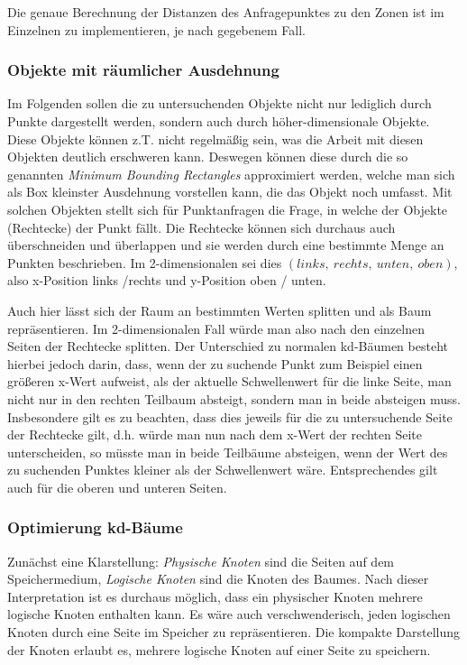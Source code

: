Die genaue Berechnung der Distanzen des Anfragepunktes zu den Zonen ist im Einzelnen
zu implementieren, je nach gegebenem Fall.

\subsubsection{Objekte mit räumlicher Ausdehnung}
Im Folgenden sollen die zu untersuchenden Objekte nicht nur lediglich durch Punkte
dargestellt werden, sondern auch durch höher-dimensionale Objekte. Diese Objekte
können z.T. nicht regelmäßig sein, was die Arbeit mit diesen Objekten deutlich
erschweren kann. Deswegen können diese durch die so genannten \textit{Minimum
Bounding Rectangles} approximiert werden, welche man sich als Box kleinster
Ausdehnung vorstellen kann, die das Objekt noch umfasst. Mit solchen Objekten
stellt sich für Punktanfragen die Frage, in welche der Objekte (Rechtecke) der
Punkt fällt. Die Rechtecke können sich durchaus auch überschneiden und überlappen
und sie werden durch eine bestimmte Menge an Punkten beschrieben. Im 2-dimensionalen
sei dies \((links,\ rechts,\ unten,\ oben)\), also x-Position links /rechts und 
y-Position oben / unten. 

Auch hier lässt sich der Raum an bestimmten Werten splitten und als Baum
repräsentieren. Im 2-dimensionalen Fall würde man also nach den einzelnen
Seiten der Rechtecke splitten. Der Unterschied zu normalen kd-Bäumen besteht
hierbei jedoch darin, dass, wenn der zu suchende Punkt zum Beispiel einen größeren
x-Wert aufweist, als der aktuelle Schwellenwert
für die linke Seite, man nicht nur in den rechten
Teilbaum absteigt, sondern man in beide absteigen muss. Insbesondere gilt es zu
beachten, dass dies jeweils für die zu untersuchende Seite der Rechtecke gilt,
d.h. würde man nun nach dem x-Wert der rechten Seite unterscheiden, so müsste man
in beide Teilbäume absteigen, wenn der Wert des zu suchenden Punktes kleiner als
der Schwellenwert wäre. Entsprechendes gilt auch für die oberen und unteren
Seiten. 

\subsubsection{Optimierung kd-Bäume}
Zunächst eine Klarstellung: \textit{Physische Knoten} sind die Seiten auf dem
Speichermedium, \textit{Logische Knoten} sind die Knoten des Baumes. Nach dieser
Interpretation ist es durchaus möglich, dass ein physischer Knoten mehrere logische
Knoten enthalten kann. Es wäre auch verschwenderisch, jeden logischen Knoten durch
eine Seite im Speicher zu repräsentieren. 
Die kompakte Darstellung der Knoten erlaubt es, mehrere logische Knoten auf einer
Seite zu speichern. 

